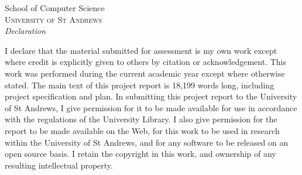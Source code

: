 \newpage
\thispagestyle{empty}

\begin{center}

\huge{School of Computer Science}\\[0.5cm]
\normalsize
\textsc{University of St Andrews}\\[2.0cm]

\emph{\LARGE Declaration}\\[2.5cm]
\end{center}
\normalsize I declare that the material submitted for assessment is my own work except where credit is explicitly given to others by citation or acknowledgement. This work was performed during the current academic year except where otherwise stated. The main text of this project report is 18,199 words long, including project specification and plan. In submitting this project report to the University of St Andrews, I give permission for it to be made available for use in accordance with the regulations of the University Library. I also give permission for the report to be made available on the Web, for this work to be used in research within the University of St Andrews, and for any software to be released on an open source basis. I retain the copyright in this work, and ownership of any resulting intellectual property.\\[1.0cm]

\vfill